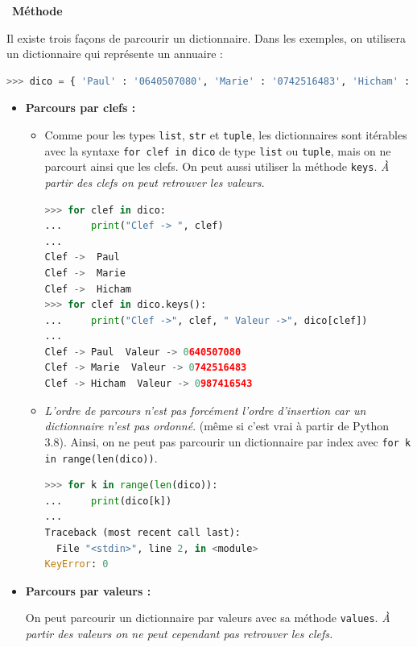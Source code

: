 \documentclass[
  11pt,
]{article}
\newcommand{\passthrough}[1]{#1}
\newcounter{cours}
\newenvironment{methode}[1]
{\par \medskip    \noindent  
 \begin {bclogo}[arrondi =0.1,logo=\bcoutil, marge=4,noborder = true] {~\textbf{Méthode}   {\itshape #1} }  \par}
{
\end{bclogo}
 \par \bigskip }
\begin{document}
\begin{methode}{}

Il existe trois façons de parcourir un dictionnaire. Dans les exemples,
on utilisera un dictionnaire qui représente un annuaire :

\begin{lstlisting}[language=Python]
>>> dico = { 'Paul' : '0640507080', 'Marie' : '0742516483', 'Hicham' : '0987416543'}
\end{lstlisting}

\begin{itemize}
\item
  \textbf{Parcours par clefs :}

  \begin{itemize}
  \item
    Comme pour les types \passthrough{\lstinline!list!},
    \passthrough{\lstinline!str!} et \passthrough{\lstinline!tuple!},
    les dictionnaires sont itérables avec la syntaxe
    \passthrough{\lstinline!for clef in dico!} de type
    \passthrough{\lstinline!list!} ou \passthrough{\lstinline!tuple!},
    mais on ne parcourt ainsi que les clefs. On peut aussi utiliser la
    méthode \passthrough{\lstinline!keys!}. \emph{À partir des clefs on
    peut retrouver les valeurs.}

\begin{lstlisting}[language=Python]
>>> for clef in dico:
...     print("Clef -> ", clef)
... 
Clef ->  Paul
Clef ->  Marie
Clef ->  Hicham
>>> for clef in dico.keys():
...     print("Clef ->", clef, " Valeur ->", dico[clef])
... 
Clef -> Paul  Valeur -> 0640507080
Clef -> Marie  Valeur -> 0742516483
Clef -> Hicham  Valeur -> 0987416543
\end{lstlisting}
  \item
    \emph{L'ordre de parcours n'est pas forcément l'ordre d'insertion
    car un dictionnaire n'est pas ordonné}. (même si c'est vrai à partir
    de Python 3.8). Ainsi, on ne peut pas parcourir un dictionnaire par
    index avec \passthrough{\lstinline!for k in range(len(dico))!}.

\begin{lstlisting}[language=Python]
>>> for k in range(len(dico)):
...     print(dico[k])
... 
Traceback (most recent call last):
  File "<stdin>", line 2, in <module>
KeyError: 0
\end{lstlisting}
  \end{itemize}
\item
  \textbf{Parcours par valeurs :}

  On peut parcourir un dictionnaire par valeurs avec sa méthode
  \passthrough{\lstinline!values!}. \emph{À partir des valeurs on ne
  peut cependant pas retrouver les clefs.}


\end{itemize}
\end{methode}
\end{document}
